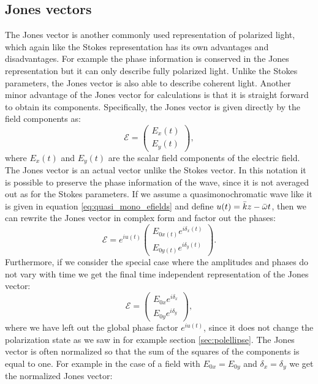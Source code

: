 \subsection{Jones vectors}
\label{sec:jones_vectors}
The Jones vector is another commonly used representation of polarized light, which again like the Stokes representation has its own advantages and disadvantages. For example the phase information is conserved in the Jones representation but it can only describe fully polarized light. Unlike the Stokes parameters, the Jones vector is also able to describe coherent light. Another minor advantage of the Jones vector for calculations is that it is straight forward to obtain its components. Specifically, the Jones vector is given directly by the field components as:
\begin{equation}
    \label{eq:jones_vector1}
    \bm{\mathcal{E}} = 
    \begin{pmatrix}
    E_x(t) \\
    E_y(t)
    \end{pmatrix},
\end{equation}
where $E_x(t)$ and $E_y(t)$ are the scalar field components of the electric field. The Jones vector is an actual vector unlike the Stokes vector. In this notation it is possible to preserve the phase information of the wave, since it is not averaged out as for the Stokes parameters. If we assume a quasimonochromatic wave like it is given in equation \ref{eq:quasi_mono_efields} and define $u(t)=\Bar{k}z-\Bar{\omega}t$, then we can rewrite the Jones vector in complex form and factor out the phases:
\begin{equation}
    \label{eq:jones_vector2}
    \bm{\mathcal{E}} = e^{iu(t)}
    \begin{pmatrix}
    E_{0x(t)}e^{i\delta_x(t)} \\
    E_{0y(t)}e^{i\delta_y(t)}
    \end{pmatrix}.
\end{equation}
 Furthermore, if we consider the special case where the amplitudes and phases do not vary with time we get the final time independent representation of the Jones vector:
 \begin{equation}
    \label{eq:jones_vector3}
    \bm{\mathcal{E}}=
    \begin{pmatrix}
    E_{0x}e^{i\delta_x} \\
    E_{0y}e^{i\delta_y}
    \end{pmatrix},
\end{equation}
where we have left out the global phase factor $e^{iu(t)}$, since it does not change the polarization state as we saw in for example section \ref{sec:polellipse}. The Jones vector is often normalized so that the sum of the squares of the components is equal to one. For example in the case of a field with $E_{0x}=E_{0y}$ and $\delta_x=\delta_y$ we get the normalized Jones vector:
